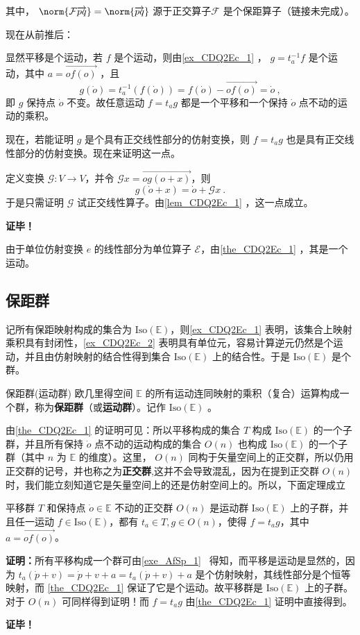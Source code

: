 其中， $\norm{\mathcal F\overrightarrow{pq}}=\norm{\overrightarrow{pq}}$ 源于正交算子$\mathcal F$ 是个保距算子（链接未完成）。

现在从前推后：

显然平移是个运动，若 $f$ 是个运动，则由\autoref{ex_CDQ2Ec_1} ， $g=t_a^{-1} f$ 是个运动，其中 $a=\overrightarrow{of(o)}$ ，且
\begin{equation}
g(\dot o)=t_a^{-1}(f(\dot o))=f(\dot o)-\overrightarrow{of(o)}=\dot o~,
\end{equation}
即 $g$ 保持点 $\dot o$ 不变。故任意运动 $f=t_ag$ 都是一个平移和一个保持 $\dot o$ 点不动的运动的乘积。

现在，若能证明 $g$ 是个具有正交线性部分的仿射变换，则 $f=t_a g$ 也是具有正交线性部分的仿射变换。现在来证明这一点。

定义变换 $\mathcal G:V\rightarrow V$，并令 $\mathcal G x=\overrightarrow{og(o+x)}$，则
\begin{equation}\label{eq_CDQ2Ec_1}
g(\dot o+x)=\dot o+\mathcal G x~.
\end{equation}
于是只需证明 $\mathcal G$ 试正交线性算子。由\autoref{lem_CDQ2Ec_1} ，这一点成立。

\textbf{证毕！}
\begin{example}{}\label{ex_CDQ2Ec_2}
由于单位仿射变换 $e$ 的线性部分为单位算子 $\mathcal E$，由\autoref{the_CDQ2Ec_1} ，其是一个运动。
\end{example}
\subsection{保距群}
记所有保距映射构成的集合为 $\mathrm{Iso(\mathbb E)}$，则\autoref{ex_CDQ2Ec_1} 表明，该集合上映射乘积具有封闭性，\autoref{ex_CDQ2Ec_2} 表明具有单位元，容易计算逆元仍然是个运动，并且由仿射映射的结合性得到集合 $\mathrm{Iso(\mathbb E)}$ 上的结合性。于是 $\mathrm{Iso}(\mathbb E)$ 是个群。
\begin{definition}{保距群(运动群)}
欧几里得空间 $\mathbb E$ 的所有运动连同映射的乘积（复合）运算构成一个群，称为\textbf{保距群}（或\textbf{运动群}）。记作 $\mathrm{Iso(\mathbb E)}$ 。
\end{definition}
由\autoref{the_CDQ2Ec_1} 的证明可见：所以平移构成的集合 $T$ 构成 $\mathrm{Iso}(\mathbb E)$ 的一个子群，并且所有保持 $\dot o$ 点不动的运动构成的集合 $O(n)$ 也构成 $\mathrm{Iso}(\mathbb E)$ 的一个子群（其中 $n$ 为 $\mathbb E$ 的维度）。这里， $O(n)$ 同构于矢量空间上的正交群，所以仍用正交群的记号，并也称之为\textbf{正交群},这并不会导致混乱，因为在提到正交群 $O(n)$ 时，我们能立刻知道它是矢量空间上的还是仿射空间上的。所以，下面定理成立
\begin{theorem}{}
平移群 $T$ 和保持点 $\dot o\in\mathbb E$ 不动的正交群 $O(n)$ 是运动群 $\mathrm{Iso(\mathbb E)}$ 上的子群，并且任一运动 $f\in\mathrm{Iso(\mathbb E)}$，都有 $t_a\in T,g\in O(n)$，使得 $f=t_ag$，其中 $a=\overrightarrow{of(o)}$。
\end{theorem}
\textbf{证明：}所有平移构成一个群可由\autoref{exe_AfSp_1}~ 得知，而平移是运动是显然的，因为 $t_a(\dot p+v)=\dot p+v+a=t_a(\dot p+v)+a$ 是个仿射映射，其线性部分是个恒等映射，而 \autoref{the_CDQ2Ec_1} 保证了它是个运动。故平移群是 $\mathrm{Iso(\mathbb E)}$ 上的子群。对于 $O(n)$ 可同样得到证明！而 $f=t_ag$ 由\autoref{the_CDQ2Ec_1} 证明中直接得到。

\textbf{证毕！}